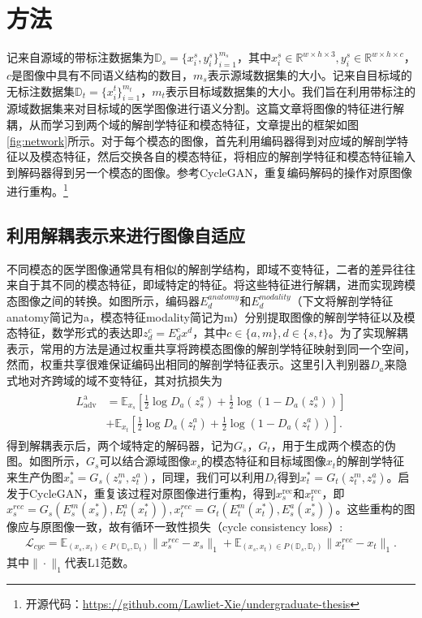 \chapter{方法}
\label{cha:method}
记来自源域的带标注数据集为$\mathbb{D}_s = \{x^s_i, y_i^s\}_{i=1}^{m_s}$，其中$x_i^s\in \mathbb{R}^{w\times h \times 3},y_i^s\in \mathbb{R}^{w\times h\times c}$，$c$是图像中具有不同语义结构的数目，$m_s$表示源域数据集的大小。记来自目标域的无标注数据集$\mathbb{D}_t=\{x_i^t\}_{i=1}^{m_t}$，$m_t$表示目标域数据集的大小。我们旨在利用带标注的源域数据集来对目标域的医学图像进行语义分割。这篇文章将图像的特征进行解耦，从而学习到两个域的解剖学特征和模态特征，文章提出的框架如图\ref{fig:network}所示。对于每个模态的图像，首先利用编码器得到对应域的解剖学特征以及模态特征，然后交换各自的模态特征，将相应的解剖学特征和模态特征输入到解码器得到另一个模态的图像。参考CycleGAN，重复编码解码的操作对原图像进行重构。\footnote{开源代码：\url{https://github.com/Lawliet-Xie/undergraduate-thesis}}

\section{利用解耦表示来进行图像自适应}
不同模态的医学图像通常具有相似的解剖学结构，即域不变特征，二者的差异往往来自于其不同的模态特征，即域特定的特征。将这些特征进行解耦，进而实现跨模态图像之间的转换。如图所示，编码器$E_d^{anatomy}$和$E_d^{modality}$（下文将解剖学特征anatomy简记为a，模态特征modality简记为m）分别提取图像的解剖学特征以及模态特征，数学形式的表达即$z_d^{c} = E^c_d{x^d}$，其中$c\in \{a,m\}, d\in \{s,t\}$。为了实现解耦表示，常用的方法是通过权重共享将跨模态图像的解剖学特征映射到同一个空间，然而，权重共享很难保证编码出相同的解剖学特征表示。这里引入判别器$D_a$来隐式地对齐跨域的域不变特征，其对抗损失为
\begin{align}
\begin{aligned}L_{\mathrm{adv}}^{\text {a }} &=\mathbb{E}_{x_s}\left[\frac{1}{2} \log D_a\left(z_s^a\right)+\frac{1}{2} \log \left(1-D_a\left(z_s^a\right)\right)\right] \\&+\mathbb{E}_{x_t}\left[\frac{1}{2} \log D_a\left(z_t^a\right)+\frac{1}{2} \log \left(1-D_a\left(z_t^a\right)\right)\right].\end{aligned}
\end{align}
得到解耦表示后，两个域特定的解码器，记为$G_s$，$G_t$，用于生成两个模态的伪图。如图所示，$G_s$可以结合源域图像$x_s$的模态特征和目标域图像$x_t$的解剖学特征来生产伪图$x_s^*=G_s(z_s^{m},z_t^{a})$，同理，我们可以利用$D_t$得到$x_t^*=G_t(z_t^{m},z_s^{a})$。启发于CycleGAN，重复该过程对原图像进行重构，得到$x_s^{\mathrm{rec}}$和$x_t^{\mathrm{rec}}$，即$x_s^{rec} = G_s(E_s^{m}(x_s^*),E_t^{a}(x_t^*)), x_t^{rec} = G_t(E_t^{m}(x_t^*),E_s^{a}(x_s^*))$。这些重构的图像应与原图像一致，故有循环一致性损失（cycle consistency loss）:
\begin{align}
\mathcal{L}_{cyc} = \mathbb{E}_{(x_s,x_t)\in P(\mathbb{D}_s,\mathbb{D}_t)}\|x_s^{rec}-x_s\|_1 + \mathbb{E}_{(x_s,x_t)\in P(\mathbb{D}_s,\mathbb{D}_t)}\|x_t^{rec}-x_t\|_1 .
\end{align}
其中$\|\cdot \|_1$代表L1范数。

